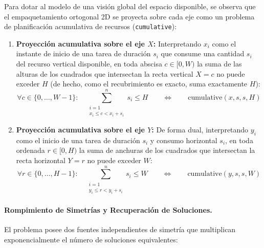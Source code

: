 Para dotar al modelo de una visión global del espacio disponible, se observa que el empaquetamiento ortogonal 2D se proyecta sobre cada eje como un problema de planificación acumulativa de recursos (\texttt{cumulative}):
\begin{enumerate}
    \item \textbf{Proyección acumulativa sobre el eje $X$:} Interpretando $x_i$ como el instante de inicio de una tarea de duración $s_i$ que consume una cantidad $s_i$ del recurso vertical disponible, en toda abscisa $c \in [0, W)$ la suma de las alturas de los cuadrados que intersectan la recta vertical $X = c$ no puede exceder $H$ (de hecho, como el recubrimiento es exacto, suma exactamente $H$):
    \[
        \forall c \in \{0, \dots, W-1\}: \quad \sum_{\substack{i=1 \\ x_i \le c < x_i + s_i}}^{n} s_i \le H
        \qquad \Longleftrightarrow \qquad \text{cumulative}(x, s, s, H)
    \]
    \item \textbf{Proyección acumulativa sobre el eje $Y$:} De forma dual, interpretando $y_i$ como el inicio de una tarea de duración $s_i$ y consumo horizontal $s_i$, en toda ordenada $r \in [0, H)$ la suma de anchuras de los cuadrados que intersectan la recta horizontal $Y = r$ no puede exceder $W$:
    \[
        \forall r \in \{0, \dots, H-1\}: \quad \sum_{\substack{i=1 \\ y_i \le r < y_i + s_i}}^{n} s_i \le W
        \qquad \Longleftrightarrow \qquad \text{cumulative}(y, s, s, W)
    \]
\end{enumerate}

\paragraph{Rompimiento de Simetrías y Recuperación de Soluciones.}
El problema posee dos fuentes independientes de simetría que multiplican exponencialmente el número de soluciones equivalentes:

